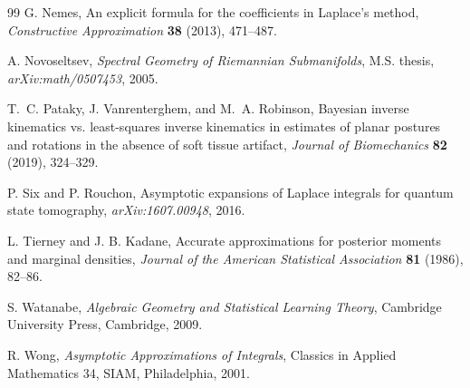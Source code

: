 \documentclass[11pt]{amsart}
\numberwithin{equation}{section}
\theoremstyle{definition}
\theoremstyle{remark}
\begin{document}
\begin{thebibliography}{99}
G. Nemes,
An explicit formula for the coefficients in Laplace's method,
\emph{Constructive Approximation} \textbf{38} (2013), 471--487.

A. Novoseltsev,
\emph{Spectral Geometry of Riemannian Submanifolds},
M.S. thesis, \emph{arXiv:math/0507453}, 2005.

T.~C. Pataky, J. Vanrenterghem, and M.~A. Robinson,
Bayesian inverse kinematics vs. least-squares inverse kinematics in estimates
of planar postures and rotations in the absence of soft tissue artifact,
\emph{Journal of Biomechanics} \textbf{82} (2019), 324--329.

P. Six and P. Rouchon,
Asymptotic expansions of Laplace integrals for quantum state tomography,
\emph{arXiv:1607.00948}, 2016.

L. Tierney and J. B. Kadane,
Accurate approximations for posterior moments and marginal densities,
\emph{Journal of the American Statistical Association} \textbf{81} (1986),
82--86.

S. Watanabe,
\emph{Algebraic Geometry and Statistical Learning Theory},
Cambridge University Press, Cambridge, 2009.

R. Wong,
\emph{Asymptotic Approximations of Integrals},
Classics in Applied Mathematics 34,
SIAM, Philadelphia, 2001.

\end{thebibliography}
\end{document}
